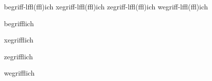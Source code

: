 
\enabletrackers[hyphenation.applied.visualize=ligatures]

\startexceptions[de]
begri{ff-}{l}{ffl}(f\zwj fl)ich
xegri{ff-}{l}{ffl}(ff\zwj l)ich
zegri{ff-}{l}{ffl}(ffl)ich
wegri{ff-}{l}{ffl}(f\zwj f\zwj l)ich
\stopexceptions

\showglyphs

\mainlanguage[de]

\startTEXpage[offset=10pt]
    begrifflich\par
    xegrifflich\par
    zegrifflich\par
    wegrifflich\par
\stopTEXpage
